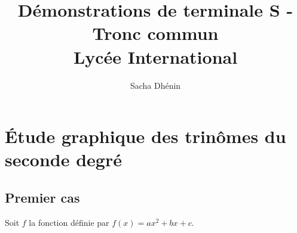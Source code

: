 

\usepackage{parcolumns}

        \title {Démonstrations de terminale S - Tronc commun \\
                Lycée International}

        \author{Sacha Dhénin}
        
\usepackage{amsthm}

\usepackage{tikzsymbols}





\newpage



\thispagestyle{empty}




\newpage

\vspace*{-2cm}

\section*{Étude graphique des trinômes du seconde degré}

\subsection*{Premier cas}

Soit $f$ la fonction définie par $f(x) = ax^2 + bx + c$. \\

